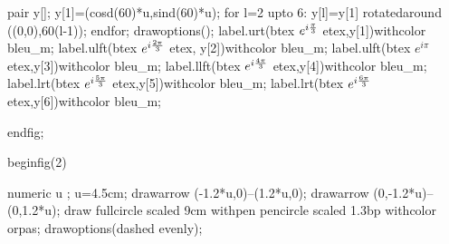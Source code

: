 \documentclass[12pt]{article}
\begin{document}
  pair y[];
  y[1]=(cosd(60)*u,sind(60)*u);
  for l=2 upto 6:
    y[l]=y[1] rotatedaround ((0,0),60(l-1));
  endfor;
  drawoptions();
  label.urt(btex $e^{i{\pi \over 3}}$ etex,y[1])withcolor bleu_m;
  label.ulft(btex $e^{i{2\pi \over 3}}$ etex, y[2])withcolor bleu_m;
  label.ulft(btex $e^{i{\pi}}$ etex,y[3])withcolor bleu_m;
  label.llft(btex $e^{i{4\pi \over 3}}$ etex,y[4])withcolor bleu_m;
  label.lrt(btex $e^{i{5\pi \over 3}}$ etex,y[5])withcolor bleu_m;
  label.lrt(btex $e^{i{6\pi \over 3}}$ etex,y[6])withcolor bleu_m;




 endfig;

beginfig(2)



 numeric u ;
 u=4.5cm;
 drawarrow (-1.2*u,0)--(1.2*u,0);
 drawarrow (0,-1.2*u)--(0,1.2*u);
 draw fullcircle scaled 9cm withpen pencircle scaled 1.3bp withcolor orpas;
 drawoptions(dashed evenly);
\end{document}
